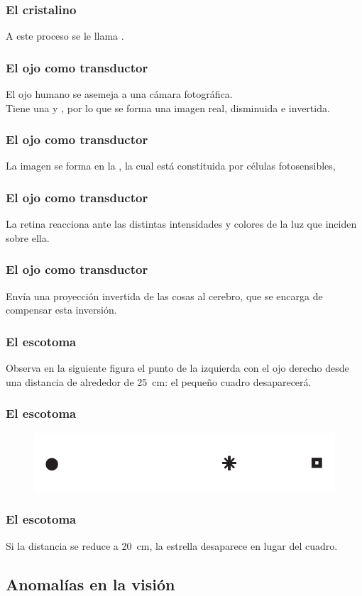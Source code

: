 \documentclass[14pt]{beamer}
\begin{document}
\begin{frame}
\frametitle{El cristalino}
A este proceso se le llama .
\end{frame}
\begin{frame}
\frametitle{El ojo como transductor}
El ojo humano se asemeja a una cámara fotográfica.
\\
\bigskip
\pause
Tiene una  y , \pause por lo que se forma una imagen real, disminuida e invertida.
\end{frame}
\begin{frame}
\frametitle{El ojo como transductor}
La imagen se forma en la , la cual está constituida por células fotosensibles,
\end{frame}
\begin{frame}
\frametitle{El ojo como transductor}
La retina reacciona ante las distintas intensidades y colores de la luz que inciden sobre ella.
\end{frame}
\begin{frame}
\frametitle{El ojo como transductor}
Envía una proyección invertida de las cosas al cerebro, que se encarga de compensar esta inversión.
\end{frame}
\begin{frame}
\frametitle{El escotoma}
Observa en la siguiente figura el punto de la izquierda con el ojo derecho desde una distancia de alrededor de \SI{25}{\centi\meter}: \pause el pequeño cuadro desaparecerá.
\end{frame}
\begin{frame}
\frametitle{El escotoma}
\begin{figure}
    \centering
    \includegraphics[scale=0.5]{Imagenes/Figura_Escotoma.png}
\end{figure}
\end{frame}
\begin{frame}
\frametitle{El escotoma}
Si la distancia se reduce a \SI{20}{\centi\meter}, la estrella desaparece en lugar del cuadro.
\end{frame}

\subsection{Anomalías en la visión}
\end{document}
